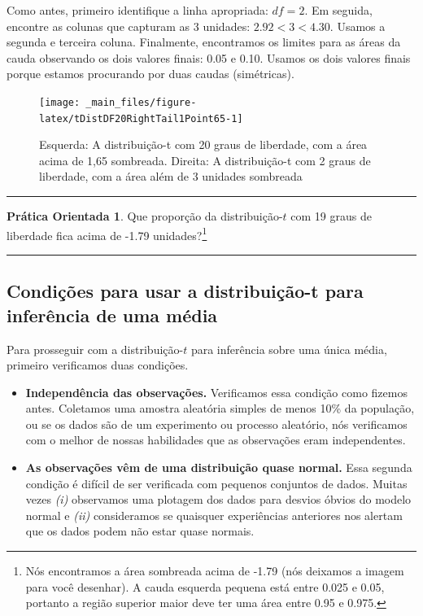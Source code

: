 \documentclass[
]{book}
\theoremstyle{definition}
\theoremstyle{definition}
\theoremstyle{definition}
\newtheorem{exercise}{Prática Orientada}[chapter]
\theoremstyle{definition}
\theoremstyle{remark}
\begin{document}
Como antes, primeiro identifique a linha apropriada: \(df = 2\). Em seguida, encontre as colunas que capturam as 3 unidades: \(2.92 < 3 < 4.30\). Usamos a segunda e terceira coluna. Finalmente, encontramos os limites para as áreas da cauda observando os dois valores finais: 0.05 e 0.10. Usamos os dois valores finais porque estamos procurando por duas caudas (simétricas).

\begin{figure}
\texttt{[image: \_main\_files/figure-latex/tDistDF20RightTail1Point65-1]} \caption{Esquerda: A distribuição-t com 20 graus de liberdade, com a área acima de 1,65 sombreada. Direita: A distribuição-t com 2 graus de liberdade, com a área além de 3 unidades sombreada}\label{fig:tDistDF20RightTail1Point65}
\end{figure}

\begin{center}\rule{0.5\linewidth}{0.5pt}\end{center}

\begin{exercise}
\protect\hypertarget{exr:unnamed-chunk-190}{}{\label{exr:unnamed-chunk-190} }Que proporção da distribuição-\(t\) com 19 graus de liberdade fica acima de -1.79 unidades?\footnote{Nós encontramos a área sombreada acima de -1.79 (nós deixamos a imagem para você desenhar). A cauda esquerda pequena está entre 0.025 e 0.05, portanto a região superior maior deve ter uma área entre 0.95 e 0.975.}
\end{exercise}

\begin{center}\rule{0.5\linewidth}{0.5pt}\end{center}

\hypertarget{conditionTDistributionOneMean}{%
\subsection{Condições para usar a distribuição-t para inferência de uma média}\label{conditionTDistributionOneMean}}

Para prosseguir com a distribuição-\(t\) para inferência sobre uma única média, primeiro verificamos duas condições.

\begin{itemize}
\item
  \textbf{Independência das observações.} Verificamos essa condição como fizemos antes. Coletamos uma amostra aleatória simples de menos 10\% da população, ou se os dados são de um experimento ou processo aleatório, nós verificamos com o melhor de nossas habilidades que as observações eram independentes.
\item
  \textbf{As observações vêm de uma distribuição quase normal.} Essa segunda condição é difícil de ser verificada com pequenos conjuntos de dados. Muitas vezes \emph{(i)} observamos uma plotagem dos dados para desvios óbvios do modelo normal e \emph{(ii)} consideramos se quaisquer experiências anteriores nos alertam que os dados podem não estar quase normais.
\end{itemize}
\end{document}

